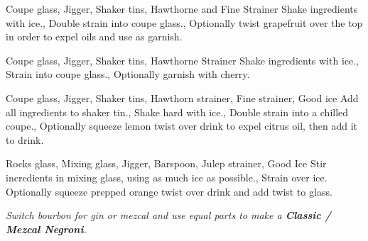 \documentclass[../main.tex]{subfiles}
\begin{document}


{Coupe glass, Jigger, Shaker tins, Hawthorne and Fine Strainer}
{
    {Shake ingredients with ice.},
    {Double strain into coupe glass.},
    {Optionally twist grapefruit over the top in order to expel oils and use as garnish.}
}

\cocktailDivider

{Coupe glass, Jigger, Shaker tins, Hawthorne Strainer}
{
    {Shake ingredients with ice.},
    {Strain into coupe glass.},
    {Optionally garnish with cherry.}
}

\cocktailDivider

{Coupe glass, Jigger, Shaker tins, Hawthorn strainer, Fine strainer, Good ice}
{
    Add all ingredients to shaker tin.,
    {Shake hard with ice.},
    {Double strain into a chilled coupe.},
    {Optionally squeeze lemon twist over drink to expel citrus oil, then add it to drink.}
}

\cocktailDivider

{Rocks glass, Mixing glass, Jigger, Barspoon, Julep strainer, Good Ice}
{
    {Stir incredients in mixing glass, using as much ice as possible.},
    {Strain over ice. Optionally squeeze prepped orange twist over drink and add twist to glass.}
}

\medskip
\begin{center}
    \textit{Switch bourbon for gin or mezcal and use equal parts to make a \textbf{Classic / Mezcal Negroni}.}
\end{center}
\end{document}
